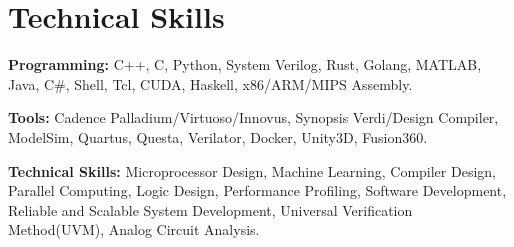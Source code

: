 \documentclass[letterpaper,11pt]{article}
\newcommand{\resumeSubHeadingListStart}{\begin{itemize}[leftmargin=0in, label={}]}
\newcommand{\resumeSubHeadingListEnd}{\end{itemize}}
\begin{document}
\section{Technical Skills}
  \vspace{2pt}
  \resumeSubHeadingListStart
    \small{\item{
        \textcolor{secondary_color}{\textbf{Programming:}}{ C++, C, Python, System Verilog, Rust, Golang, MATLAB, Java, C\#, Shell, Tcl, CUDA, Haskell, x86/ARM/MIPS Assembly.} \\ \vspace{3pt}
        
        \textcolor{secondary_color}{\textbf{Tools:}}{ Cadence Palladium/Virtuoso/Innovus, Synopsis Verdi/Design Compiler, ModelSim, Quartus, Questa, Verilator, Docker, Unity3D, Fusion360.} \\ \vspace{3pt}

        \textcolor{secondary_color}{\textbf{Technical Skills:}}{ Microprocessor Design, Machine Learning, Compiler Design, Parallel Computing, Logic Design, Performance Profiling, Software Development, Reliable and Scalable System Development, Universal Verification Method(UVM), Analog Circuit Analysis.} \\ \vspace{3pt} 
    }}
  \resumeSubHeadingListEnd
\end{document}
